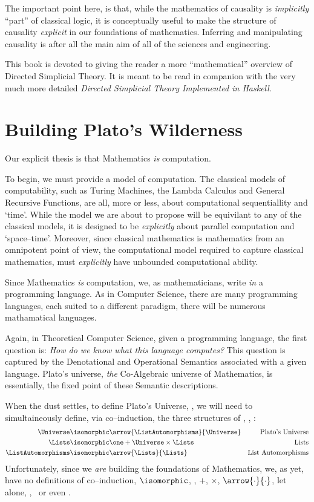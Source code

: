 \documentclass[a4paper,openany]{amsbook}
\begin{document}
The important point here, is that, while the mathematics of causality is
\emph{implicitly} ``part'' of classical logic, it is conceptually useful to make
the structure of causality \emph{explicit} in our foundations of mathematics. 
Inferring and manipulating causality is after all the main aim of all of the
sciences and engineering.

This book is devoted to giving the reader a more ``mathematical'' overview of
Directed Simplicial Theory.  It is meant to be read in companion with the very
much more detailed \textit{Directed Simplicial Theory Implemented in Haskell}.

\section{Building Plato's Wilderness}

Our explicit thesis is that Mathematics \emph{is} computation.

To begin, we must provide a model of computation. The classical models of
computability, such as Turing Machines, the Lambda Calculus and General
Recursive Functions, are all, more or less, about computational sequentiallity
and `time'. While the model we are about to propose will be equivilant to any of
the classical models, it is designed to be \emph{explicitly} about parallel
computation and `space--time'. Moreover, since classical mathematics is
mathematics from an omnipotent point of view, the computational model required
to capture classical mathematics, must \emph{explicitly} have unbounded
computational ability.

Since Mathematics \emph{is} computation, we, as mathematicians, write \emph{in}
a programming language. As in Computer Science, there are many programming
languages, each suited to a different paradigm, there will be numerous
mathamatical languages.

Again, in Theoretical Computer Science, given a programming language, the first
question is: \emph{How do we know what this language computes?} This question is
captured by the Denotational and Operational Semantics associated with a given
language. Plato's universe, \emph{the} Co-Algebraic universe of Mathematics,
is essentially, the fixed point of these Semantic descriptions.

When the dust settles, to define Plato's Universe, \Universe, we will need to
simultaineously define, via co--induction, the three structures of \Universe,
\Lists, \ListAutomorphisms:
%
\begin{align}
   \Universe          & \isomorphic \arrow{\ListAutomorphisms}{\Universe} & \text{Plato's Universe} \\
   \Lists             & \isomorphic \one + \Universe \times \Lists        & \text{Lists} \\
   \ListAutomorphisms & \isomorphic \arrow{\Lists}{\Lists}                & \text{List Automorphisms}
\end{align}
%
Unfortunately, since we \emph{are} building the foundations of Mathematics, we,
as yet, have no definitions of co--induction, $\isomorphic$, \one, $+$, $\times$,
$\arrow{\cdot}{\cdot}$, let alone, \Universe, \Lists\ or even \ListAutomorphisms.
\end{document}

